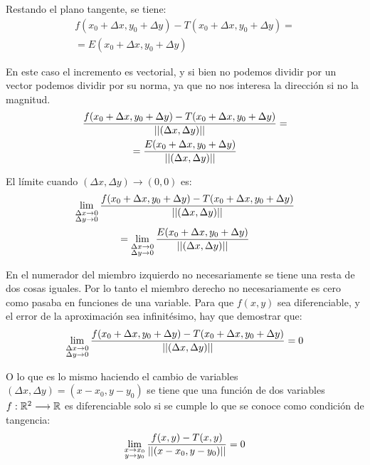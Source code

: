 \documentclass[a5paper,12pt,twoside]{book}
\begin{document}
Restando el plano tangente, se tiene:
\begin{multline*}
    f(x_0 + \Delta x,y_0 + \Delta y) - T(x_0 + \Delta x,y_0 + \Delta y) =
    \\
    = E(x_0 + \Delta x,y_0 + \Delta y)
\end{multline*}

En este caso el incremento es vectorial, y si bien no podemos dividir por un vector podemos dividir por su norma, ya que no nos interesa la dirección si no la magnitud.
\begin{multline*}
    \frac{f(x_0 + \Delta x,y_0 + \Delta y) - T(x_0 + \Delta x,y_0 + \Delta y)}{{\left|\left| {(\Delta x,\Delta y)} \right|\right|}} =
    \\
    = \frac{E(x_0 + \Delta x,y_0 + \Delta y)}{{\left|\left| {(\Delta x,\Delta y)} \right|\right|}}
\end{multline*}

El límite cuando $(\Delta x,\Delta y) \to (0,0)$ es:
\begin{multline*}
    \lim_{\substack{\Delta x \to 0 \\ \Delta y \to 0}} \frac{f(x_0 + \Delta x,y_0 + \Delta y) - T(x_0 + \Delta x,y_0 + \Delta y)}{{\left|\left| {(\Delta x,\Delta y)} \right|\right|}}
    \\
    = \lim_{\substack{\Delta x \to 0 \\ \Delta y \to 0}} \frac{E(x_0 + \Delta x,y_0 + \Delta y)}{{\left|\left| {(\Delta x,\Delta y)} \right|\right|}}
\end{multline*}

En el numerador del miembro izquierdo no necesariamente se tiene una resta de dos cosas iguales.
Por lo tanto el miembro derecho no necesariamente es cero como pasaba en funciones de una variable.
Para que $f(x,y)$ sea diferenciable, y el error de la aproximación sea infinitésimo, hay que demostrar que:
\begin{equation*}
    \lim_{\substack{\Delta x \to 0 \\ \Delta y \to 0}} \frac{f(x_0 + \Delta x,y_0 + \Delta y) - T(x_0 + \Delta x,y_0 + \Delta y)}{{\left|\left| {(\Delta x,\Delta y)} \right|\right|}} = 0
\end{equation*}

O lo que es lo mismo haciendo el cambio de variables $(\Delta x,\Delta y)=(x-x_0,y-y_0)$ se tiene que una función de dos variables $f:\mathbb{R}^2 \longrightarrow \mathbb{R}$ es diferenciable solo si se cumple lo que se conoce como condición de tangencia:
\begin{equation*}
    \lim_{\substack{x \to x_0 \\ y \to y_0}} \frac{f(x,y) - T(x,y)}{{\left|\left| {(x-x_0,y-y_0)} \right|\right|}} = 0
\end{equation*}
\end{document}
